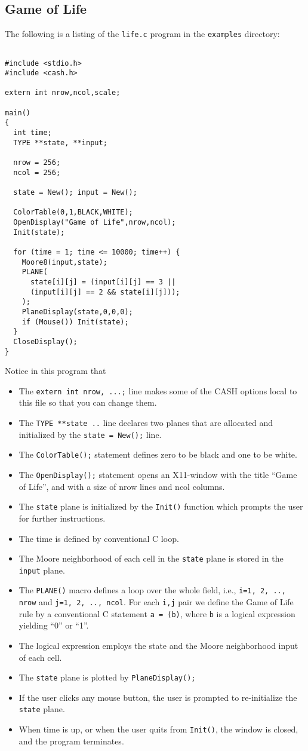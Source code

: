 \documentclass[12pt]{article}
\begin{document}
\subsection{Game of Life}
The following is a listing of the {\tt life.c} program
in the {\tt examples} directory:
\begin{verbatim}

#include <stdio.h>
#include <cash.h>

extern int nrow,ncol,scale;

main()
{
  int time;
  TYPE **state, **input;

  nrow = 256;
  ncol = 256;

  state = New(); input = New();

  ColorTable(0,1,BLACK,WHITE);
  OpenDisplay("Game of Life",nrow,ncol);
  Init(state);

  for (time = 1; time <= 10000; time++) {
    Moore8(input,state);
    PLANE(
      state[i][j] = (input[i][j] == 3 ||
      (input[i][j] == 2 && state[i][j]));
    );
    PlaneDisplay(state,0,0,0);
    if (Mouse()) Init(state);
  }
  CloseDisplay();
}
\end{verbatim}

Notice in this program that
\begin{itemize}
\item The {\tt extern int nrow, ...;} line makes some of the CASH
options local to this file so that you can change them.
\item The {\tt TYPE **state ..} line declares two planes
that are allocated and initialized by the {\tt state = New();} line.
\item The {\tt ColorTable();} statement defines zero to be black
and one to be white.
\item The {\tt OpenDisplay();} statement opens an X11-window
with the title ``Game of Life'', and with a size of nrow lines
and ncol columns.
\item The {\tt state} plane is initialized by the {\tt Init()}
function which prompts the user for further instructions.
\item The time is defined by conventional C loop.
\item The Moore neighborhood of each cell in the {\tt state} plane is
stored in the {\tt input} plane. 
\item The {\tt PLANE()} macro defines a loop over the whole
field, i.e., {\tt i=1, 2, .., nrow} and {\tt j=1, 2, .., ncol}.
For each {\tt i,j} pair we define the Game of Life rule by a
conventional C statement {\tt a = (b)}, where {\tt b} is a logical
expression yielding ``0'' or ``1''. 
\item The logical expression employs the state and 
the Moore neighborhood input of each cell.
\item The {\tt state} plane is plotted by {\tt PlaneDisplay();}
\item If the user clicks any mouse button, the user is prompted
to re-initialize the {\tt state} plane.
\item When time is up, or when the user quits from {\tt Init()},
the window is closed, and the program terminates.
\end{itemize}
\end{document}
